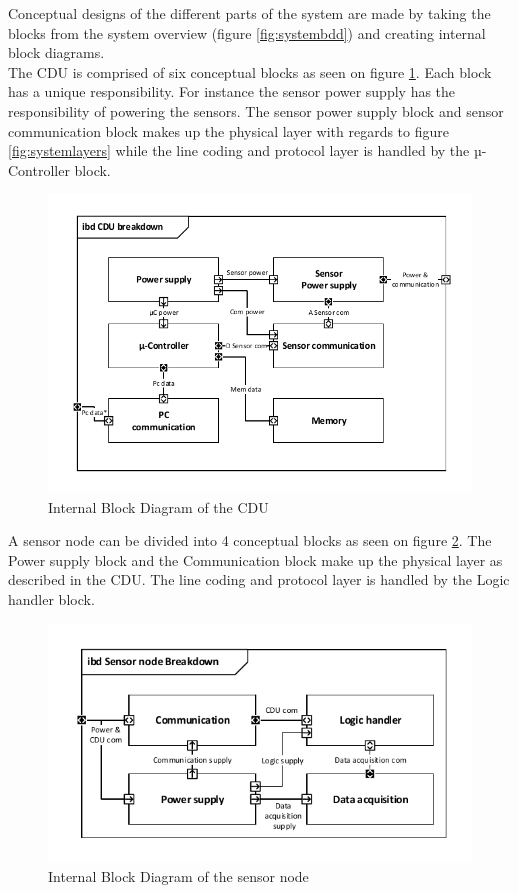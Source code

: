 Conceptual designs of the different parts of the system are made by taking the blocks from the system overview (figure \ref{fig:systembdd}) and creating internal block diagrams.\\
The CDU is comprised of six conceptual blocks as seen on figure \ref{CDU_IBD}. Each block has a unique responsibility. For instance the sensor power supply has the responsibility of powering the sensors. The sensor power supply block and sensor communication block makes up the physical layer with regards to figure \ref{fig:systemlayers} while the line coding and protocol layer is handled by the µ-Controller block. 
\begin{figure}[hbpt]
	\centering
	\includegraphics[width=.8\textwidth]{billeder/11ProjectDescription/CDU_IBD}
	\caption{Internal Block Diagram of the CDU}
	\label{CDU_IBD}
\end{figure}
A sensor node can be divided into 4 conceptual blocks as seen on figure \ref{fig:SN_IBD}. The Power supply block and the Communication block make up the physical layer as described in the CDU. The line coding and protocol layer is handled by the Logic handler block.
\begin{figure}[hbpt]
\centering
\includegraphics[width=.8\textwidth]{billeder/11ProjectDescription/Sensor_IBD}
\caption{Internal Block Diagram of the sensor node}
\label{fig:SN_IBD}
\end{figure}
